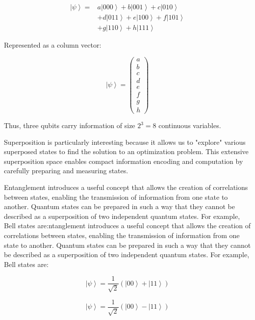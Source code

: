 \documentclass{article}
\begin{document}
\begin{multicols}{2}
\begin{align}
    \left|\psi\right> = & a\left|000\right> + b\left|001\right> + c\left|010\right> \nonumber \\
    & + d\left|011\right> + e\left|100\right> + f\left|101\right> \nonumber \\
    & + g\left|110\right> + h\left|111\right>
\end{align}

Represented as a column vector:

\begin{equation}
    \left|\psi\right> = \begin{pmatrix} a \\ b \\ c \\ d \\ e \\ f \\ g \\ h \end{pmatrix}
\end{equation}

Thus, three qubits carry information of size \( 2^3 = 8 \) continuous variables.

Superposition is particularly interesting because it allows us to "explore" various superposed states to find the solution to an optimization problem. This extensive superposition space enables compact information encoding and computation by carefully preparing and measuring states.

Entanglement introduces a useful concept that allows the creation of correlations between states, enabling the transmission of information from one state to another. Quantum states can be prepared in such a way that they cannot be described as a superposition of two independent quantum states. For example, Bell states are:ntanglement introduces a useful concept that allows the creation of correlations between states, enabling the transmission of information from one state to another. Quantum states can be prepared in such a way that they cannot be described as a superposition of two independent quantum states. For example, Bell states are:

\begin{equation}
    \left|\psi\right> = \frac{1}{\sqrt{2}}\left(\left|00\right> + \left|11\right>\right)
\end{equation}

\begin{equation}
    \left|\psi\right> = \frac{1}{\sqrt{2}}\left(\left|00\right> - \left|11\right>\right)
\end{equation}


\end{multicols}
\end{document}
